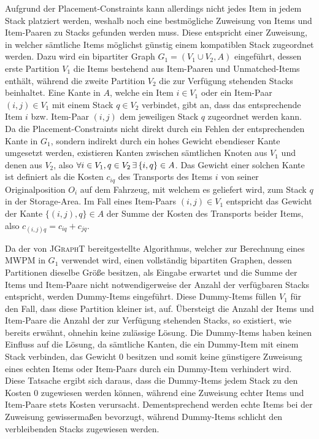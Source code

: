 Aufgrund der Placement-Constraints kann allerdings nicht jedes Item in jedem Stack platziert werden, weshalb noch eine bestmögliche Zuweisung von Items und Item-Paaren zu Stacks gefunden werden muss. Diese entspricht einer Zuweisung, in welcher sämtliche Items möglichst günstig einem kompatiblen Stack zugeordnet werden. Dazu wird ein bipartiter Graph $G_1 = (V_1 \cup V_2, A)$ eingeführt, dessen erste Partition $V_1$ die Items bestehend aus Item-Paaren und Unmatched-Items enthält, während die zweite Partition $V_2$ die zur Verfügung stehenden Stacks beinhaltet.
Eine Kante in $A$, welche ein Item $i \in V_1$ oder ein Item-Paar $(i, j) \in V_1$ mit einem Stack $q \in V_2$ verbindet, gibt an, dass das entsprechende Item $i$ bzw. Item-Paar $(i, j)$ dem jeweiligen Stack $q$ zugeordnet werden kann. Da die Placement-Constraints nicht direkt durch ein Fehlen der entsprechenden Kante in $G_1$, sondern indirekt durch ein hohes Gewicht ebendieser Kante umgesetzt werden, existieren Kanten zwischen sämtlichen Knoten
aus $V_1$ und denen aus $V_2$, also $\forall i \in V_1, q \in V_2 \thinspace \exists \thinspace \{i, q\} \in A$.
Das Gewicht einer solchen Kante ist definiert als die Kosten $c_{iq}$ des Transports des Items $i$ von seiner Originalposition $O_i$ auf dem Fahrzeug, mit welchem es geliefert wird, zum Stack $q$
in der Storage-Area. Im Fall eines Item-Paars $(i, j) \in V_1$ entspricht das
Gewicht der Kante $\{(i, j), q\} \in A$ der Summe der Kosten des Transports beider Items, also $c_{(i, j)q} = c_{iq} + c_{jq}$.

Da der von \textsc{JGraphT} bereitgestellte Algorithmus, welcher zur Berechnung eines \textsc{MWPM} in $G_1$ verwendet wird,
einen vollständig bipartiten Graphen, dessen Partitionen dieselbe Größe besitzen, als Eingabe erwartet und die Summe der Items und Item-Paare
nicht notwendigerweise der Anzahl der verfügbaren Stacks entspricht, werden Dummy-Items eingeführt.
Diese Dummy-Items füllen $V_1$ für den Fall, dass diese Partition kleiner ist, auf.
Übersteigt die Anzahl der Items und Item-Paare die Anzahl der zur Verfügung stehenden Stacks, so existiert,
wie bereits erwähnt, ohnehin keine zulässige Lösung.
Die Dummy-Items haben keinen Einfluss auf die Lösung, da sämtliche Kanten, die ein Dummy-Item mit einem Stack verbinden,
das Gewicht $0$ besitzen und somit keine günstigere Zuweisung eines echten Items oder Item-Paars durch ein Dummy-Item
verhindert wird. Diese Tatsache ergibt sich daraus, dass die Dummy-Items jedem Stack zu den Kosten $0$ zugewiesen
werden können, während eine Zuweisung echter Items und Item-Paare stets Kosten verursacht. Dementsprechend werden
echte Items bei der Zuweisung gewissermaßen bevorzugt, während Dummy-Items schlicht den verbleibenden Stacks zugewiesen werden.

